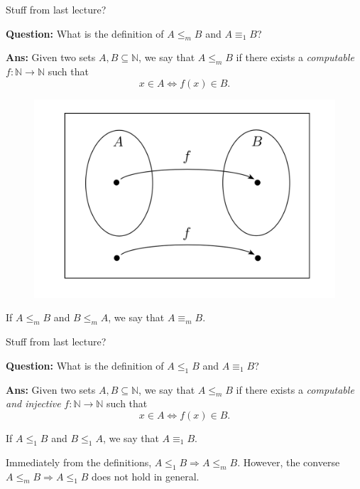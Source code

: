 \documentclass{beamer}
\newcommand{\N}{{\mathbb N}}
\begin{document}
\begin{frame}{Stuff from last lecture?}

\textbf{Question:} What is the definition of $A \leq_m B$ and $A \equiv_1 B$?

\pause

\textbf{Ans:} Given two sets $A, B \subseteq \N$, we say that $A \leq_m B$ if there exists a \textit{computable} $f: \N \to \N$ such that
$$x \in A \Leftrightarrow f(x) \in B.$$

\begin{figure}
    \centering
    \includegraphics[scale=0.3]{img/mapping_reduc.png}
\end{figure}

If $A \leq_m B$ and $B \leq_m A$, we say that $A \equiv_m B$.

\end{frame}

\begin{frame}{Stuff from last lecture?}

\textbf{Question:} What is the definition of $A \leq_1 B$ and $A \equiv_1 B$?

\pause

\textbf{Ans:} Given two sets $A, B \subseteq \N$, we say that $A \leq_m B$ if there exists a \textit{computable and injective} $f: \N \to \N$ such that
$$x \in A \Leftrightarrow f(x) \in B.$$

If $A \leq_1 B$ and $B \leq_1 A$, we say that $A \equiv_1 B$.

\pause

Immediately from the definitions, $A \leq_1 B \Rightarrow A \leq_m B$. However, the converse $A \leq_m B \Rightarrow A \leq_1 B$ does not hold in general.
\end{frame}
\end{document}
